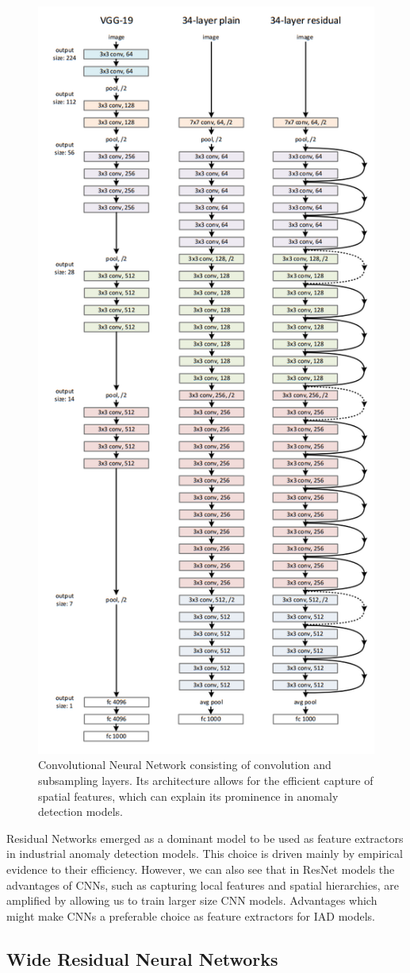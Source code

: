 \begin{figure}[t]
	\begin{center}
		\includegraphics[width=0.5\linewidth]{Chapter_2/resnet.png}
	\end{center}
	\caption{Convolutional Neural Network consisting of convolution and subsampling layers. Its architecture allows for the efficient capture of spatial features, which can explain its prominence in anomaly detection models.}
	\label{fig:cnn}
\end{figure}

Residual Networks emerged as a dominant model to be used as feature extractors in industrial anomaly detection models. This choice is driven mainly by empirical evidence to their efficiency. However, we can also see that in ResNet models the advantages of CNNs, such as capturing local features and spatial hierarchies, are amplified by allowing us to train larger size CNN models. Advantages which might make CNNs a preferable choice as feature extractors for IAD models.

\subsection{Wide Residual Neural Networks}
\label{wideresnet}

